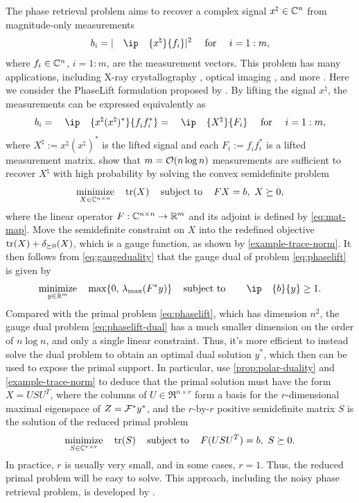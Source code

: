 \begin{example}
  The phase retrieval problem aims to recover a complex signal
  $x^\natural\in\mathbb{C}^n$ from magnitude-only measurements
  \[
    b_i = |\ip{x^\natural}{f_i}|^2 \text{ for } i = 1:m,
  \]
   where $f_i \in \mathbb{C}^n$, $i = 1:m$, are the measurement vectors.
  This problem has many applications, including X-ray crystallography
  \cite{harrison:93}, optical imaging \cite{shechtman2015phase}, and more
  \cite{candes:2013}. Here we consider the PhaseLift formulation proposed by
  \citet{candes2013phaselift}. By lifting the signal $x^\natural$, the measurements can
  be expressed equivalently as
  \[
    b_i = \ip{x^\natural (x^\natural)^*}{f_i^{}f_i^*} = \ip{X^\natural}{F_i}
    \text{ for } i = 1:m,
  \]
  where $X^\natural := x^\natural (x^\natural)^*$ is the lifted signal and
  each $F_i := f_i^{}f_i^*$ is a lifted measurement matrix.
  \citet{candes2013phaselift} show that $m = \mathcal{O}(n\log n)$ measurements are
  sufficient to recover $X^\natural$ with high probability by solving the
  convex semidefinite problem
  \begin{equation} \label{eq:phaselift}
    \displaystyle\mathop{\hbox{\rm minimize}}_{X \in \mathbb{C}^{n\times n}}\enspace\enspace \operatorname{tr}(X)
    \enspace\enspace\mathop{\hbox{\rm subject to}}\enspace\enspace F X = b,\ X \succeq 0,
  \end{equation}
  where the linear operator $F:\mathbb{C}^{n\times n}\to\mathbb{R}^m$ and its adjoint is defined
  by \eqref{eq:mat-map}.
  Move the semidefinite constraint on $X$ into the
  redefined objective $\operatorname{tr}(X)+\delta_{\succeq0}(X)$, which is a gauge
  function, as shown by \autoref{example-trace-norm}. It then follows from
  \eqref{eq:gaugeduality} that the gauge dual of problem \eqref{eq:phaselift}
  is given by 
  \begin{equation} \label{eq:phaselift-dual}
    \minimize{y \in \Re^{m}}\enspace \max\{0,\,\lambda_{\max}(F^*y)\} \enspace\st\enspace \ip{b}{y} \geq 1.
  \end{equation}
  Compared with the primal problem \eqref{eq:phaselift}, which has dimension
  $n^2$, the gauge dual problem \eqref{eq:phaselift-dual} has a much smaller
  dimension on the order of $n\log n$, and only a single linear constraint.
  Thus, it's more efficient to instead solve the dual problem to obtain an
  optimal dual solution $y^*$, which then can be used to expose the primal
  support. In particular, use \autoref{prop:polar-duality} and
  \autoref{example-trace-norm} to deduce that the primal solution must have the
  form $X=USU^T$, where the columns of $U\in\Re^{n\times r}$ form a basis for
  the $r$-dimensional maximal eigenspace of $Z=\mathcal{F}^* y^*$, and the
  $r$-by-$r$ positive semidefinite matrix $S$ is the solution of the reduced
  primal problem 
  \begin{equation*} \label{eq:phaselift-recover}
    \displaystyle\mathop{\hbox{\rm minimize}}_{S \in \mathbb{C}^{r\times r}}\enspace\enspace \operatorname{tr}(S)
    \enspace\enspace\mathop{\hbox{\rm subject to}}\enspace\enspace F(USU^T) = b,\ S \succeq 0.
  \end{equation*}
  In practice, $r$ is usually very small, and in some cases, $r=1$. Thus, the
  reduced primal problem will be easy to solve. This approach, including the
  noisy phase retrieval problem, is developed by \citet{friedlander2016low}. 
\end{example}



